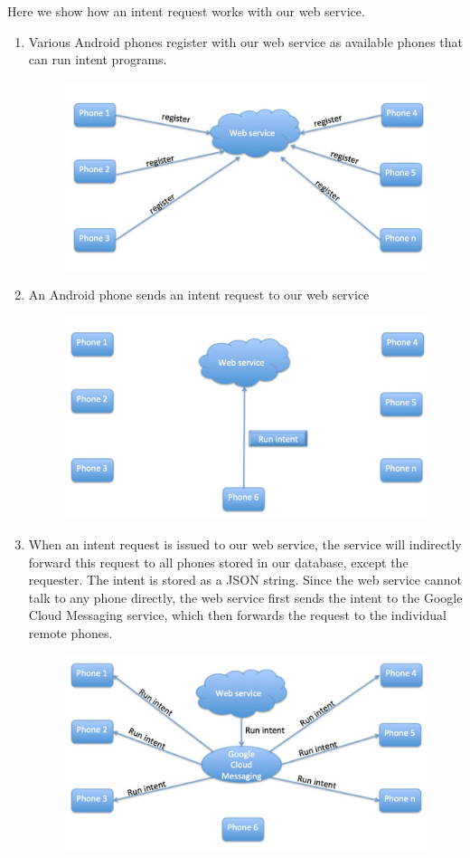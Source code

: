 \documentclass{acm_proc_article-sp}
\begin{document}
Here we show how an intent request works with our web service.

\begin{enumerate}
\item Various Android phones register with our web service as available phones that can run intent programs.  

\begin{figure}[h]
  \centering
  \includegraphics[width=.4\textwidth]{s1.jpg}
\end{figure}

\item An Android phone sends an intent request to our web service

\begin{figure}[h]
  \centering
  \includegraphics[width=.4\textwidth]{s2.jpg}
\end{figure}

\item When an intent request is issued to our web service, the service
  will indirectly forward this request to all phones stored in our
  database, except the requester.  The intent is stored as a JSON
  string. Since the web service cannot talk to any phone directly, the
  web service first sends the intent to the Google Cloud Messaging
  service, which then forwards the request to the individual remote
  phones.

\begin{figure}[h]
  \centering
  \includegraphics[width=.4\textwidth]{s3.jpg}
\end{figure}


\end{enumerate}
\end{document}
